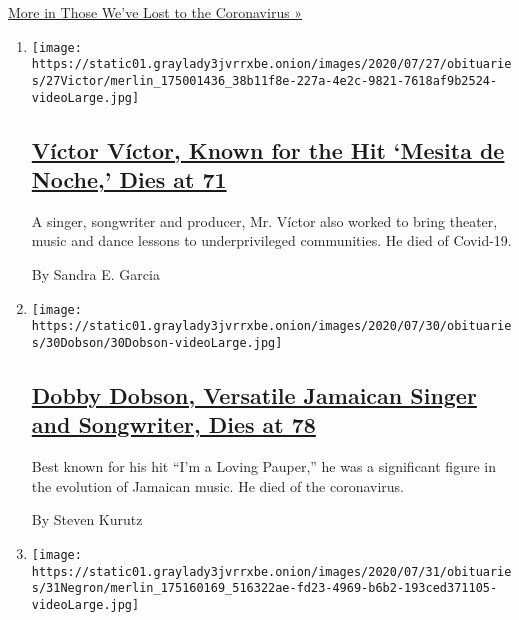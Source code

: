 \href{/series/people-died-coronavirus-obituaries}{More in Those We've
Lost to the Coronavirus »}

\begin{enumerate}
\def\labelenumi{\arabic{enumi}.}
\item
  \texttt{[image: https://static01.graylady3jvrrxbe.onion/images/2020/07/27/obituaries/27Victor/merlin\_175001436\_38b11f8e-227a-4e2c-9821-7618af9b2524-videoLarge.jpg]}

  \hypertarget{vuxedctor-vuxedctor-known-for-the-hit-mesita-de-noche-dies-at-71}{%
  \subsection{\texorpdfstring{\href{/2020/08/01/obituaries/victor-victor-dead-coronavirus.html}{Víctor
  Víctor, Known for the Hit `Mesita de Noche,' Dies at
  71}}{Víctor Víctor, Known for the Hit `Mesita de Noche,' Dies at 71}}\label{vuxedctor-vuxedctor-known-for-the-hit-mesita-de-noche-dies-at-71}}

  A singer, songwriter and producer, Mr. Víctor also worked to bring
  theater, music and dance lessons to underprivileged communities. He
  died of Covid-19.

  By Sandra E. Garcia
\item
  \texttt{[image: https://static01.graylady3jvrrxbe.onion/images/2020/07/30/obituaries/30Dobson/30Dobson-videoLarge.jpg]}

  \hypertarget{dobby-dobson-versatile-jamaican-singer-and-songwriter-dies-at-78}{%
  \subsection{\texorpdfstring{\href{/2020/07/31/obituaries/dobby-dobson-dead-coronavirus.html}{Dobby
  Dobson, Versatile Jamaican Singer and Songwriter, Dies at
  78}}{Dobby Dobson, Versatile Jamaican Singer and Songwriter, Dies at 78}}\label{dobby-dobson-versatile-jamaican-singer-and-songwriter-dies-at-78}}

  Best known for his hit ``I'm a Loving Pauper,'' he was a significant
  figure in the evolution of Jamaican music. He died of the coronavirus.

  By Steven Kurutz
\item
  \texttt{[image: https://static01.graylady3jvrrxbe.onion/images/2020/07/31/obituaries/31Negron/merlin\_175160169\_516322ae-fd23-4969-b6b2-193ced371105-videoLarge.jpg]}

  \hypertarget{dr-eddie-negruxf3n-a-physician-full-of-fun-is-dead-at-69}{%
}
\end{enumerate}
